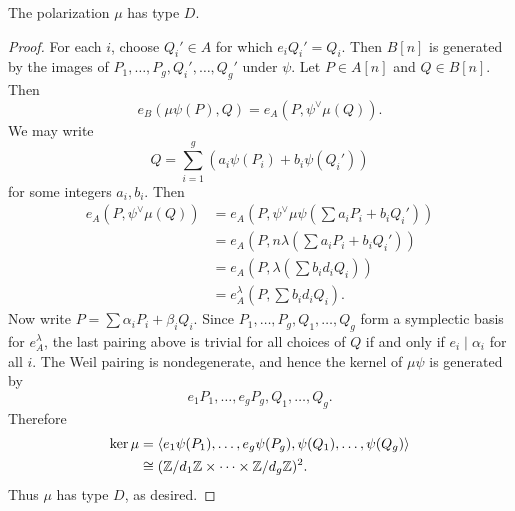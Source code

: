 \documentclass{amsart}
\begin{document}
\begin{lemma}\label{lem:typeDlem}
The polarization $\mu$ has type $D$.
\end{lemma}
  
\begin{proof}
  For each $i$, choose $Q_i' \in A$ for which $e_iQ_i' = Q_i$. Then $B[n]$ is generated by the images of $P_1, \ldots, P_g, Q_i', \ldots, Q_g'$ under $\psi$. Let $P \in A[n]$ and $Q \in B[n]$. Then
  \[
    e_B(\mu\psi(P),Q) = e_A(P,\psi^\vee\mu(Q)).
  \]
  We may write
  \[
    Q = \sum_{i=1}^g (a_i \psi(P_i) + b_i \psi(Q_i'))
  \]
  for some integers $a_i, b_i$. Then
  \begin{align*}
    e_A(P, \psi^\vee\mu(Q)) &= e_A\left(P, \psi^\vee\mu\psi\left(\sum a_i P_i + b_iQ_i'\right)\right) \\
                       &= e_A\left(P, n\lambda \left(\sum a_i P_i + b_iQ_i'\right)\right) \\
                       &= e_A\left(P, \lambda\left(\sum b_id_iQ_i\right)\right) \\
                       &= e_A^\lambda\left(P,\sum b_id_iQ_i\right).
  \end{align*}
  Now write $P = \sum \alpha_i P_i + \beta_i Q_i$. Since $P_1,\ldots,P_g,Q_1,\ldots,Q_g$ form a symplectic basis for $e_A^\lambda$, the last pairing above is trivial for all choices of $Q$ if and only if $e_i \mid \alpha_i$ for all $i$. The Weil pairing is nondegenerate, and hence the kernel of $\mu\psi$ is generated by
  \[
    e_1P_1, \ldots, e_gP_g, Q_1, \ldots, Q_g.
  \]
  Therefore
  \begin{align*}
    \ker \mu &= \langle e_1\psi(P_1), \ldots, e_g\psi(P_g), \psi(Q_1), \ldots, \psi(Q_g) \rangle \\
    &\cong (\mathbb{Z}/d_1 \mathbb{Z} \times \cdots \times \mathbb{Z}/d_g\mathbb{Z})^2.
  \end{align*}
%
%
Thus $\mu$ has type $D$, as desired.
\end{proof}
\end{document}
